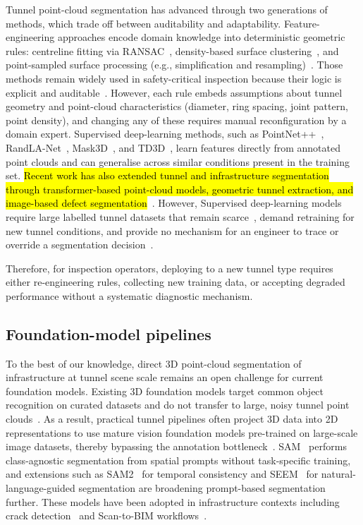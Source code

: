 \documentclass[a4paper,fleqn]{cas-dc}
\begin{document}
{Tunnel point-cloud segmentation has advanced through two generations of methods, which trade off between auditability and adaptability. Feature-engineering approaches encode domain knowledge into deterministic geometric rules: centreline fitting via RANSAC~\cite{fischler1981ransac}, density-based surface clustering~\cite{ester1996dbscan}, and point-sampled surface processing (e.g., simplification and resampling)~\cite{pauly2002}. Those methods remain widely used in safety-critical inspection because their logic is explicit and auditable~\cite{weidner2024generalized}. However, each rule embeds assumptions about tunnel geometry and point-cloud characteristics (diameter, ring spacing, joint pattern, point density), and changing any of these requires manual reconfiguration by a domain expert. Supervised deep-learning methods, such as PointNet++~\cite{qi2017pointnet}, RandLA-Net~\cite{hu2020randla}, Mask3D~\cite{schult2023mask3d}, and TD3D~\cite{kolodiazhnyi2024td3d}, learn features directly from annotated point clouds and can generalise across similar conditions present in the training set. \hl{Recent work has also extended tunnel and infrastructure segmentation through transformer-based point-cloud models, geometric tunnel extraction, and image-based defect segmentation}~\cite{wang2026serialformer, wang2025automated, yang2024yologsd, liang2026ecayolo}. However, Supervised deep-learning models require large labelled tunnel datasets that remain scarce~\cite{su2024review}, demand retraining for new tunnel conditions, and provide no mechanism for an engineer to trace or override a segmentation decision~\cite{cha2024deep}.

Therefore, for inspection operators, deploying to a new tunnel type requires either re-engineering rules, collecting new training data, or accepting degraded performance without a systematic diagnostic mechanism.

\subsection{Foundation-model pipelines}

To the best of our knowledge, direct 3D point-cloud segmentation of infrastructure at tunnel scene scale remains an open challenge for current foundation models. Existing 3D foundation models target common object recognition on curated datasets and do not transfer to large, noisy tunnel point clouds~\cite{camuffo2022recent, liu2023openshape, guo2023pointbind, xu2024pointllm}. As a result, practical tunnel pipelines often project 3D data into 2D representations to use mature vision foundation models pre-trained on large-scale image datasets, thereby bypassing the annotation bottleneck~\cite{caron2021dino, franceschelli2024training}. SAM~\cite{kirillov2023sam} performs class-agnostic segmentation from spatial prompts without task-specific training, and extensions such as SAM2~\cite{ravi2024sam2} for temporal consistency and SEEM~\cite{zou2023segment} for natural-language-guided segmentation are broadening prompt-based segmentation further. These models have been adopted in infrastructure contexts including crack detection~\cite{ge2024cracksam} and Scan-to-BIM workflows~\cite{wang2024omni, pan2024zero}.

}
\end{document}

